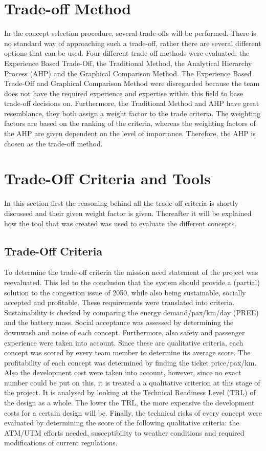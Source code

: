 \section{Trade-off Method}
In the concept selection procedure, several trade-offs will be performed. There is no standard way of approaching such a trade-off, rather there are several different options that can be used. Four different trade-off methods were evaluated: the Experience Based Trade-Off, the Traditional Method, the Analytical Hierarchy Process (AHP) and the Graphical Comparison Method. The Experience Based Trade-Off and Graphical Comparison Method were disregarded because the team does not have the required experience and expertise within this field to base trade-off decisions on. Furthermore, the Traditional Method and AHP have great resemblance, they both assign a weight factor to the trade criteria. The weighting factors are based on the ranking of the criteria, whereas the weighting factors of the AHP are given dependent on the level of importance. Therefore, the AHP is chosen as the trade-off method. 


\section{Trade-Off Criteria and Tools}
In this section first the reasoning behind all the trade-off criteria is shortly discussed and their given weight factor is given. Thereafter it will be explained how the tool that was created was used to evaluate the different concepts. 

\subsection{Trade-Off Criteria}
To determine the trade-off criteria the mission need statement of the project was reevaluated. This led to the conclusion that the system should provide a (partial) solution to the congestion issue of 2050, while also being sustainable, socially accepted and profitable. These requirements were translated into criteria. Sustainability is checked by comparing the energy demand/pax/km/day (PREE) and the battery mass. Social acceptance was assessed by determining the downwash and noise of each concept. Furthermore, also safety and passenger experience were taken into account. Since these are qualitative criteria, each concept was scored by every team member to determine its average score. The profitability of each concept was determined by finding the ticket price/pax/km. Also the development cost were taken into account, however, since no exact number could be put on this, it is treated a a qualitative criterion at this stage of the project. It is analysed by looking at the Technical Readiness Level (TRL) of the design as a whole. The lower the TRL, the more expensive the development costs for a certain design will be. Finally, the technical risks of every concept were evaluated by determining the score of the following qualitative criteria: the ATM/UTM efforts needed, susceptibility to weather conditions and required modifications of current regulations.


